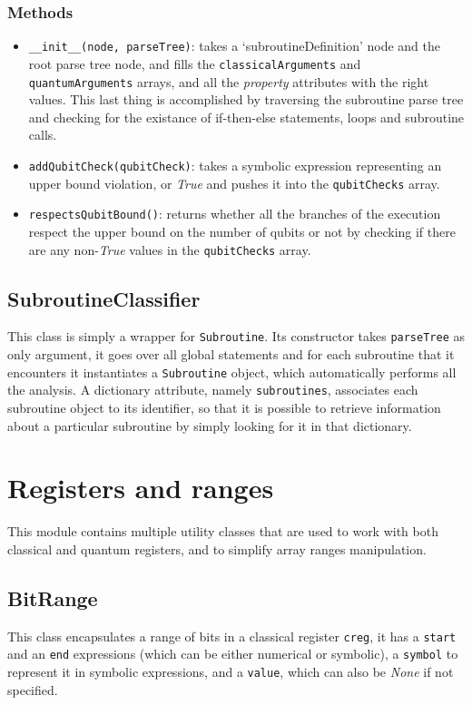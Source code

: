 \documentclass[12pt,a4paper]{report}
\theoremstyle{definition}
\theoremstyle{definition}
\theoremstyle{definition}
\begin{document}
\subsubsection{Methods}
\begin{itemize}
    \itemsep 0em
    \item \texttt{\_\_init\_\_(node, parseTree)}: takes a `subroutineDefinition' node and the root parse tree node, and fills the \texttt{classicalArguments} and \texttt{quantumArguments} arrays, and all the \textit{property} attributes with the right values. This last thing is accomplished by traversing the subroutine parse tree and checking for the existance of if-then-else statements, loops and subroutine calls.
    \item \texttt{addQubitCheck(qubitCheck)}: takes a symbolic expression representing an upper bound violation, or \textit{True} and pushes it into the \texttt{qubitChecks} array.
    \item \texttt{respectsQubitBound()}: returns whether all the branches of the execution respect the upper bound on the number of qubits or not by checking if there are any non-\textit{True} values in the \texttt{qubitChecks} array.
\end{itemize}

\subsection{SubroutineClassifier}
This class is simply a wrapper for \texttt{Subroutine}. Its constructor takes \texttt{parseTree} as only argument, it goes over all global statements and for each subroutine that it encounters it instantiates a \texttt{Subroutine} object, which automatically performs all the analysis. A dictionary attribute, namely \texttt{subroutines}, associates each subroutine object to its identifier, so that it is possible to retrieve information about a particular subroutine by simply looking for it in that dictionary.

\section{Registers and ranges}
This module contains multiple utility classes that are used to work with both classical and quantum registers, and to simplify array ranges manipulation.


\subsection{BitRange}
This class encapsulates a range of bits in a classical register \texttt{creg}, it has a \texttt{start} and an \texttt{end} expressions (which can be either numerical or symbolic), a \texttt{symbol} to represent it in symbolic expressions, and a \texttt{value}, which can also be \textit{None} if not specified.
\end{document}
